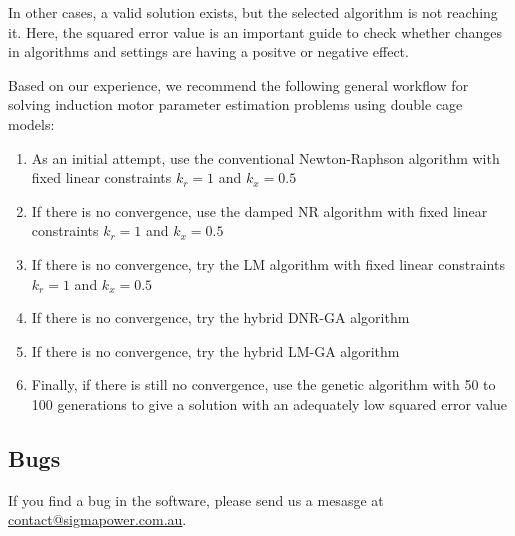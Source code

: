\documentclass{article}
\begin{document}
In other cases, a valid solution exists, but the selected algorithm is not reaching it. Here, the squared error value is an important guide to check whether changes in algorithms and settings are having a positve or negative effect. 

Based on our experience, we recommend the following general workflow for solving induction motor parameter estimation problems using double cage models:

\begin{enumerate}
\item As an initial attempt, use the conventional Newton-Raphson algorithm with fixed linear constraints $k_{r} = 1$ and $k_{x} = 0.5$
\item If there is no convergence, use the damped NR algorithm with fixed linear constraints $k_{r} = 1$ and $k_{x} = 0.5$
\item If there is no convergence, try the LM algorithm with fixed linear constraints $k_{r} = 1$ and $k_{x} = 0.5$
\item If there is no convergence, try the hybrid DNR-GA algorithm
\item If there is no convergence, try the hybrid LM-GA algorithm
\item Finally, if there is still no convergence, use the genetic algorithm with 50 to 100 generations to give a solution with an adequately low squared error value
\end{enumerate}

\subsection{Bugs}
If you find a bug in the software, please send us a mesasge at \href{mailto:contact@sigmapower.com.au}{contact@sigmapower.com.au}.

\newpage


\end{document}
